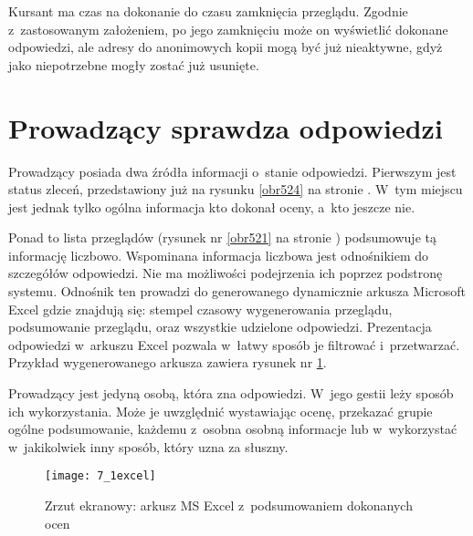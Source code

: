 \medskip
Kursant ma czas na dokonanie do czasu zamknięcia przeglądu. Zgodnie z~zastosowanym założeniem, po jego zamknięciu może on wyświetlić dokonane odpowiedzi, ale adresy do anonimowych kopii mogą być już nieaktywne, gdyż jako niepotrzebne mogły zostać już usunięte.

\section{Prowadzący sprawdza odpowiedzi}
Prowadzący posiada dwa źródła informacji o~stanie odpowiedzi. Pierwszym jest status zleceń, przedstawiony już na rysunku \ref{obr524} na stronie \pageref{obr524}. W~tym miejscu jest jednak tylko ogólna informacja kto dokonał oceny, a~kto jeszcze nie.

\medskip
Ponad to lista przeglądów (rysunek nr \ref{obr521} na stronie \pageref{obr521}) podsumowuje tą informację liczbowo. Wspominana informacja liczbowa jest odnośnikiem do szczegółów odpowiedzi. Nie ma możliwości podejrzenia ich poprzez podstronę systemu. Odnośnik ten prowadzi do generowanego dynamicznie arkusza Microsoft Excel gdzie znajdują się: stempel czasowy wygenerowania przeglądu, podsumowanie przeglądu, oraz wszystkie udzielone odpowiedzi. Prezentacja odpowiedzi w~arkuszu Excel pozwala w~łatwy sposób je filtrować i~przetwarzać. Przykład wygenerowanego arkusza zawiera rysunek nr \ref{obr71}.

\medskip
Prowadzący jest jedyną osobą, która zna odpowiedzi. W~jego gestii leży sposób ich wykorzystania. Może je uwzględnić wystawiając ocenę, przekazać grupie ogólne podsumowanie, każdemu z~osobna osobną informacje lub w~wykorzystać w~jakikolwiek inny sposób, który uzna za słuszny.

\begin{figure}[!h]
    \texttt{[image: 7\_1excel]}
    \caption{Zrzut ekranowy: arkusz MS Excel z~podsumowaniem dokonanych ocen}
    \label{obr71}
\end{figure}


\clearpage
